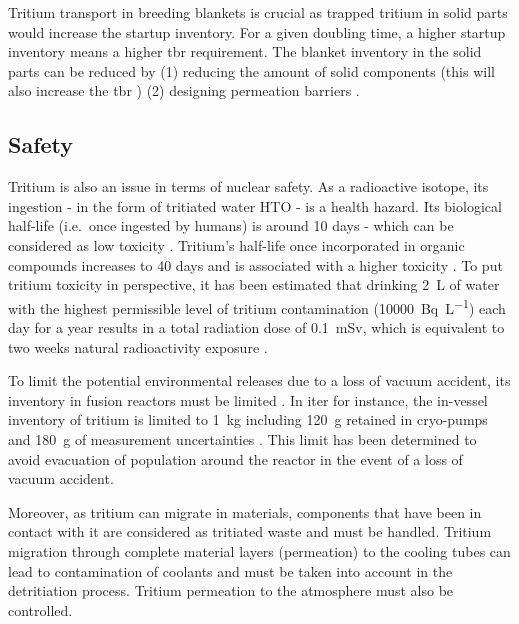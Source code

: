 Tritium transport in \glspl{breeding blanket} is crucial as trapped tritium in solid parts would increase the \gls{startup inventory}.
For a given doubling time, a higher \gls{startup inventory} means a higher \gls{tbr} requirement.
The blanket \gls{inventory} in the solid parts can be reduced by (1) reducing the amount of solid components (this will also increase the \gls{tbr} \cite{shimwell_multiphysics_2019}) (2) designing permeation barriers .

\subsection{Safety}
Tritium is also an issue in terms of nuclear safety.
As a radioactive \gls{isotope}, its ingestion - in the form of tritiated water HTO - is a health hazard.
Its biological half-life (i.e.\ once ingested by humans) is around 10 days - which can be considered as low toxicity .
Tritium's half-life once incorporated in organic compounds increases to 40 days and is associated with a higher toxicity \cite{bridges_review_2007}.
To put tritium toxicity in perspective, it has been estimated that drinking \SI{2}{L} of water with the highest permissible level of tritium contamination (\SI{10000}{Bq.L^{-1}}) each day for a year results in a total radiation dose of \SI{0.1}{mSv}, which is equivalent to two weeks natural radioactivity exposure .

To limit the potential environmental releases due to a loss of vacuum accident, its \gls{inventory} in fusion reactors must be limited .
In \acrshort{iter} for instance, the in-vessel \gls{inventory} of tritium is limited to \SI{1}{kg} including \SI{120}{g} retained in cryo-pumps and \SI{180}{g} of measurement uncertainties .
This limit has been determined to avoid evacuation of population around the reactor in the event of a loss of vacuum accident.

Moreover, as tritium can migrate in materials, components that have been in contact with it are considered as tritiated waste and must be handled.
Tritium migration through complete material layers (\gls{permeation}) to the cooling tubes  can lead to contamination of coolants and must be taken into account in the detritiation process.
Tritium permeation to the atmosphere must also be controlled.

